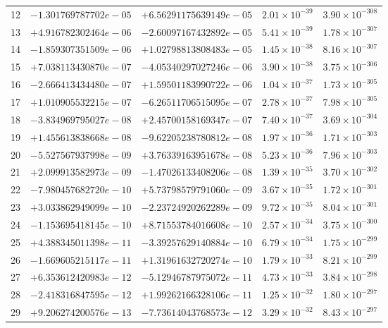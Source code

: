 \documentclass[11pt]{article}
\begin{document}
\begin{longtable}{rllll}
12 & $-1.301769787702e-05$ & $+6.56291175639149e-05$ & $2.01 \times 10^{-39}$ & $3.90 \times 10^{-308}$ \\
13 & $+4.916782302464e-06$ & $-2.60097167432892e-05$ & $5.41 \times 10^{-39}$ & $1.78 \times 10^{-307}$ \\
14 & $-1.859307351509e-06$ & $+1.02798813808483e-05$ & $1.45 \times 10^{-38}$ & $8.16 \times 10^{-307}$ \\
15 & $+7.038113430870e-07$ & $-4.05340297027246e-06$ & $3.90 \times 10^{-38}$ & $3.75 \times 10^{-306}$ \\
16 & $-2.666413434480e-07$ & $+1.59501183990722e-06$ & $1.04 \times 10^{-37}$ & $1.73 \times 10^{-305}$ \\
17 & $+1.010905532215e-07$ & $-6.26511706515095e-07$ & $2.78 \times 10^{-37}$ & $7.98 \times 10^{-305}$ \\
18 & $-3.834969795027e-08$ & $+2.45700158169347e-07$ & $7.40 \times 10^{-37}$ & $3.69 \times 10^{-304}$ \\
19 & $+1.455613838668e-08$ & $-9.62205238780812e-08$ & $1.97 \times 10^{-36}$ & $1.71 \times 10^{-303}$ \\
20 & $-5.527567937998e-09$ & $+3.76339163951678e-08$ & $5.23 \times 10^{-36}$ & $7.96 \times 10^{-303}$ \\
\midrule
21 & $+2.099913582973e-09$ & $-1.47026133408206e-08$ & $1.39 \times 10^{-35}$ & $3.70 \times 10^{-302}$ \\
22 & $-7.980457682720e-10$ & $+5.73798579791060e-09$ & $3.67 \times 10^{-35}$ & $1.72 \times 10^{-301}$ \\
23 & $+3.033862949099e-10$ & $-2.23724920262289e-09$ & $9.72 \times 10^{-35}$ & $8.04 \times 10^{-301}$ \\
24 & $-1.153695418145e-10$ & $+8.71553784016608e-10$ & $2.57 \times 10^{-34}$ & $3.75 \times 10^{-300}$ \\
25 & $+4.388345011398e-11$ & $-3.39257629140884e-10$ & $6.79 \times 10^{-34}$ & $1.75 \times 10^{-299}$ \\
26 & $-1.669605215117e-11$ & $+1.31961632720274e-10$ & $1.79 \times 10^{-33}$ & $8.21 \times 10^{-299}$ \\
27 & $+6.353612420983e-12$ & $-5.12946787975072e-11$ & $4.73 \times 10^{-33}$ & $3.84 \times 10^{-298}$ \\
28 & $-2.418316847595e-12$ & $+1.99262166328106e-11$ & $1.25 \times 10^{-32}$ & $1.80 \times 10^{-297}$ \\
29 & $+9.206274200576e-13$ & $-7.73614043768573e-12$ & $3.29 \times 10^{-32}$ & $8.43 \times 10^{-297}$ \\

\end{longtable}
\end{document}
